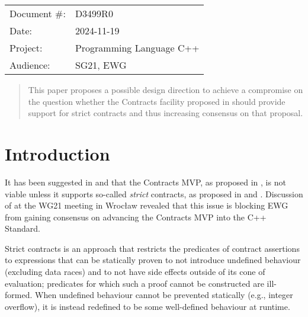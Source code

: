 \begin{tabular}{ll}
Document \#: & D3499R0 \\
Date: &2024-11-19 \\
Project: & Programming Language C++ \\
Audience: & SG21, EWG
\end{tabular}

\begin{abstract}
This paper proposes a possible design direction to achieve a compromise on the question whether the Contracts facility proposed in \cite{P2900R11} should provide support for strict contracts and thus increasing consensus on that proposal.
\end{abstract}







\section{Introduction}

It has been suggested in \cite{P3173R0} and \cite{P3362R0} that the Contracts MVP, as proposed in \cite{P2900R11}, is not viable unless it supports so-called \emph{strict} contracts, as proposed in \cite{P2680R1} and \cite{P3285R0}. Discussion of \cite{P2900R11} at the WG21 meeting in Wroc\l aw revealed that this issue is blocking EWG from gaining consensus on advancing the Contracts MVP into the C++ Standard.

Strict contracts is an approach that restricts the predicates of contract assertions to expressions that can be statically proven to not introduce undefined behaviour (excluding data races) and to not have side effects outside of its cone of evaluation; predicates for which such a proof cannot be constructed are ill-formed. When undefined behaviour cannot be prevented statically (e.g., integer overflow), it is instead redefined to be some well-defined behaviour at runtime.

